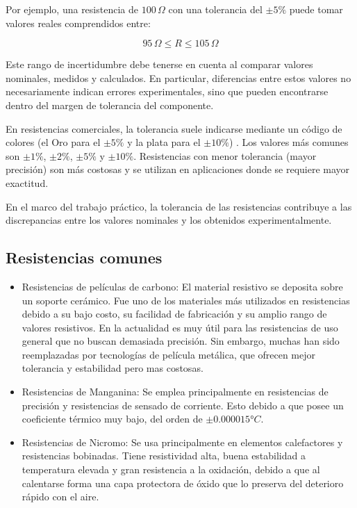Por ejemplo, una resistencia de $100\,\Omega$ con una tolerancia del $\pm 5\%$ puede tomar valores reales comprendidos entre:

\[
95\,\Omega \leq R \leq 105\,\Omega
\]

Este rango de incertidumbre debe tenerse en cuenta al comparar valores nominales, medidos y calculados. En particular, diferencias entre estos valores no necesariamente indican errores experimentales, sino que pueden encontrarse dentro del margen de tolerancia del componente.

En resistencias comerciales, la tolerancia suele indicarse mediante un código de colores (el Oro para el $\pm 5\%$ y la plata para el $\pm 10\%$) . Los valores más comunes son $\pm 1\%$, $\pm 2\%$, $\pm 5\%$ y $\pm 10\%$. Resistencias con menor tolerancia (mayor precisión) son más costosas y se utilizan en aplicaciones donde se requiere mayor exactitud.

En el marco del trabajo práctico, la tolerancia de las resistencias contribuye a las discrepancias entre los valores nominales y los obtenidos experimentalmente.

\subsection{Resistencias comunes}
\begin{itemize}
    \item Resistencias de películas de carbono: El material resistivo se deposita sobre un soporte cerámico. Fue uno de los materiales más utilizados en resistencias debido a su bajo costo, su facilidad de fabricación y su amplio rango de valores resistivos. En la actualidad es muy útil para las resistencias de uso general que no buscan demasiada precisión. Sin embargo, muchas han sido reemplazadas por tecnologías de película metálica, que ofrecen mejor tolerancia y estabilidad pero mas costosas.

    \item Resistencias de Manganina: Se emplea principalmente en resistencias de precisión y resistencias de sensado de corriente. Esto debido a que posee un coeficiente térmico muy bajo, del orden de $±0.000015 °C $.

    \item Resistencias de Nicromo: Se usa principalmente en elementos calefactores y resistencias bobinadas. Tiene resistividad alta, buena estabilidad a temperatura elevada y gran resistencia a la oxidación, debido a que al calentarse forma una capa protectora de óxido que lo preserva del deterioro rápido con el aire.
\end{itemize}

